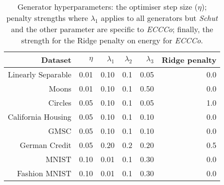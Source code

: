 \begin{table}

\caption{Generator hyperparameters: the optimiser step size ($\eta$); penalty strengths where $\lambda_1$ applies to all generators but \textit{Schut} and the other parameter are specific to \textit{ECCCo}; finally, the strength for the Ridge penalty on energy for \textit{ECCCo}.\label{tab:genparams} \newline}
\centering
\fontsize{8}{10}\selectfont
\begin{tabular}[t]{rrrrrr}
\toprule
Dataset & $\eta$ & $\lambda_1$ & $\lambda_2$ & $\lambda_3$ & Ridge penalty\\
\midrule
Linearly Separable & 0.01 & 0.10 & 0.1 & 0.05 & 0.0\\
Moons & 0.01 & 0.10 & 0.1 & 0.50 & 0.0\\
Circles & 0.05 & 0.10 & 0.1 & 0.05 & 1.0\\
California Housing & 0.05 & 0.10 & 0.1 & 0.10 & 0.0\\
GMSC & 0.05 & 0.10 & 0.1 & 0.10 & 0.0\\
German Credit & 0.05 & 0.20 & 0.2 & 0.20 & 0.5\\
MNIST & 0.10 & 0.01 & 0.1 & 0.30 & 0.0\\
Fashion MNIST & 0.10 & 0.01 & 0.1 & 0.30 & 0.0\\
\bottomrule
\end{tabular}
\end{table}
